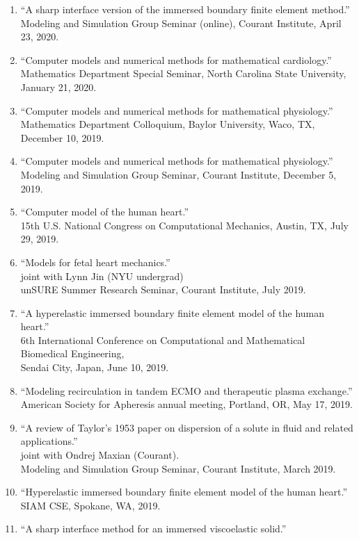 \documentclass{article} %
\begin{document}
\begin{enumerate}
\item ``A sharp interface version of the immersed boundary finite element method.'' \\
Modeling and Simulation Group Seminar (online), Courant Institute, April 23, 2020.
\item ``Computer models and numerical methods for mathematical cardiology.'' \\
Mathematics Department Special Seminar, North Carolina State University, January 21, 2020.
\item ``Computer models and numerical methods for mathematical physiology.'' \\
Mathematics Department Colloquium, Baylor University, Waco, TX, December 10, 2019.
\item ``Computer models and numerical methods for mathematical physiology.'' \\
Modeling and Simulation Group Seminar, Courant Institute, December 5, 2019.
\item ``Computer model of the human heart.'' \\
15th U.S. National Congress on Computational Mechanics, Austin, TX, July 29, 2019. 
\item ``Models for fetal heart mechanics.'' \\
joint with Lynn Jin (NYU undergrad) \\
unSURE Summer Research Seminar, Courant Institute, July 2019.
\item ``A hyperelastic immersed boundary finite element model of the human heart.'' \\
6th International Conference on Computational and Mathematical Biomedical Engineering,\\ Sendai City, Japan, June 10, 2019.
\item ``Modeling recirculation in tandem ECMO and therapeutic plasma exchange.'' \\
American Society for Apheresis annual meeting, Portland, OR, May 17, 2019.
\item ``A review of Taylor's 1953 paper on dispersion of a solute in fluid and related applications.'' \\
joint with Ondrej Maxian (Courant). \\
Modeling and Simulation Group Seminar, Courant Institute, March 2019.
\item ``Hyperelastic immersed boundary finite element model of the human heart.'' \\
SIAM CSE, Spokane, WA, 2019.
\item ``A sharp interface method for an immersed viscoelastic solid.'' \\

\end{enumerate}
\end{document}

